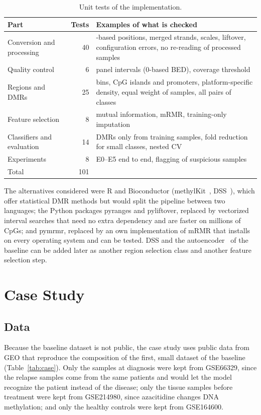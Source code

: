 \documentclass[runningheads]{llncs}
\begin{document}
\begin{table}[!htb]
\centering
\caption{Unit tests of the implementation.}
\label{tab:tests}
\small
\begin{tabular}{>{\raggedright\arraybackslash}p{3.6cm}r>{\raggedright\arraybackslash}p{9cm}}
\toprule
Part & Tests & Examples of what is checked \\
\midrule
Conversion and processing & 40 & 1-based positions, merged strands, scales, liftover, configuration errors, no re-reading of processed samples \\
Quality control & 6 & panel intervals (0-based BED), coverage threshold \\
Regions and DMRs & 25 & bins, CpG islands and promoters, platform-specific density, equal weight of samples, all pairs of classes \\
Feature selection & 8 & mutual information, mRMR, training-only imputation \\
Classifiers and evaluation & 14 & DMRs only from training samples, fold reduction for small classes, nested CV \\
Experiments & 8 & E0--E5 end to end, flagging of suspicious samples \\
\midrule
Total & 101 & \\
\bottomrule
\end{tabular}
\end{table}

The alternatives considered were R and Bioconductor (methylKit~\cite{akalin2012}, DSS~\cite{feng2014}), which offer statistical DMR methods but would split the pipeline between two languages; the Python packages pyranges and pyliftover, replaced by vectorized interval searches that need no extra dependency and are faster on millions of CpGs; and pymrmr, replaced by an own implementation of mRMR that installs on every operating system and can be tested. DSS and the autoencoder~\cite{hinton2006} of the baseline can be added later as another region selection class and another feature selection step.

\section{Case Study}\label{sec:case}

\subsection{Data}
Because the baseline dataset is not public, the case study uses public data from GEO that reproduce the composition of the first, small dataset of the baseline (Table~\ref{tab:case}). Only the samples at diagnosis were kept from GSE66329, since the relapse samples come from the same patients and would let the model recognize the patient instead of the disease; only the tissue samples before treatment were kept from GSE214980, since azacitidine changes DNA methylation; and only the healthy controls were kept from GSE164600.
\end{document}
